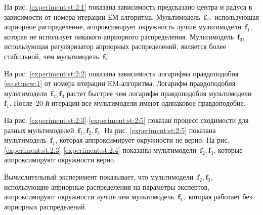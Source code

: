 На рис. \ref{experiment:st:2:1} показана зависимость предсказано центра и радуса в зависимости от номера итерации ЕМ-алгоритма.
Мультимодель~$\textbf{f}_2,$ использующая априорное распределение, аппроксимирует окружность лучше мультимодели~$\textbf{f}_1,$ которая не использует никакого априорного распределения.
Мультимодель~$\textbf{f}_3,$ использующая регуляризатор априорных распределений, является более стабильной, чем мультимодель~$\textbf{f}_2$.

На рис. \ref{experiment:st:2:2} показана зависимость логарифма правдоподобия \eqref{eq:st:new:1} от номера итерации EM-алгоритма.
Логарифм правдоподобия мультимодели~$\textbf{f}_2, \textbf{f}_3$ растет быстрее чем логарифм правдоподобия мультимодели~$\textbf{f}_1$.  После~$20$-й итерации все мультимодели имеют одинаковое правдоподобие.

На рис. \ref{experiment:st:2:3}-\ref{experiment:st:2:5} показан процесс сходимости для разных мультимоделей~$\textbf{f}_1, \textbf{f}_2, \textbf{f}_3$.
На рис. \ref{experiment:st:2:5} показана мультимодель~$\textbf{f}_1$, которая аппроксимирует окружности не верно.
На рис. \ref{experiment:st:2:3}-\ref{experiment:st:2:4} показаны мультимодели~$\textbf{f}_2, \textbf{f}_3$, которые аппроксимируют окружности верно.

Вычислительный эксперимент показывает, что мультимодели~$\textbf{f}_2, \textbf{f}_3,$ использующие априорные распределения на параметры экспертов, аппроксимируют окружности лучше чем мультимодель~$\textbf{f}_1,$ которая работает без априорных распределений.



